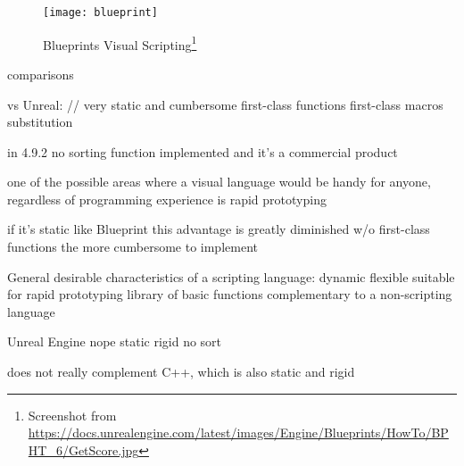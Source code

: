 \begin{figure}[h!]
\centering
\texttt{[image: blueprint]}
\caption{Blueprints Visual Scripting\protect\footnote{Screenshot from  \url{https://docs.unrealengine.com/latest/images/Engine/Blueprints/HowTo/BPHT_6/GetScore.jpg}}}
\label{fig:blueprint}
\end{figure}

comparisons

vs Unreal: // very static and cumbersome
    first-class functions
    first-class macros
    substitution
    
    in 4.9.2 no sorting function implemented
        and it's a commercial product
        
        one of the possible areas where a visual language would be handy for anyone, regardless of programming experience is rapid prototyping
        
        if it's static like Blueprint this advantage is greatly diminished
    w/o first-class functions the more cumbersome to implement
    

General desirable characteristics of a scripting language:
	dynamic
	flexible
	suitable for rapid prototyping
	library of basic functions
	complementary to a non-scripting language
	
Unreal Engine
	nope
	static
	rigid
	no sort
	
	does not really complement C++, which is also static and rigid

